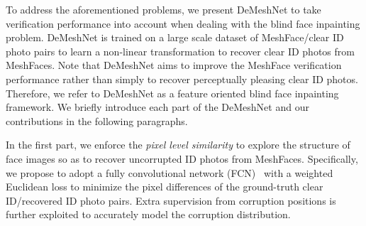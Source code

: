 \documentclass[10pt,twocolumn,letterpaper]{article}
\begin{document}
To address the aforementioned problems, we present DeMeshNet to take verification performance into account when dealing with the blind face inpainting problem. DeMeshNet is trained on a large scale dataset of  MeshFace/clear ID photo pairs to learn a non-linear transformation to recover clear ID photos from MeshFaces. Note that DeMeshNet aims to improve the MeshFace verification performance rather than simply to recover perceptually pleasing clear ID photos. Therefore, we refer to DeMeshNet as a feature oriented blind face inpainting framework. We briefly introduce each part of the DeMeshNet and our contributions in the following paragraphs.







In the first part, we enforce the \textit{pixel level similarity} to explore the structure of face images so as to recover uncorrupted ID photos from MeshFaces. Specifically, we propose to adopt a fully convolutional network (FCN)~\cite{long2015fully} with a weighted Euclidean loss to minimize the pixel differences of the ground-truth clear ID/recovered ID photo pairs. Extra supervision from corruption positions is further exploited to accurately model the corruption distribution.
\end{document}

